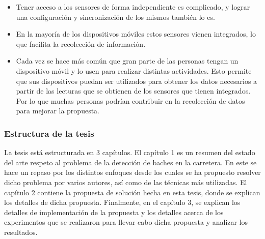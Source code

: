 		\begin{itemize}
			\item Tener acceso a los sensores de forma independiente es complicado, y lograr una configuración y sincronización de los mismos también lo es.
			\item En la mayoría de los dispositivos móviles estos sensores vienen integrados, lo que facilita la recolección de información.
			\item Cada vez se hace más común que gran parte de las personas tengan un dispositivo móvil y lo usen para realizar distintas actividades.
				Esto permite que sus dispositivos puedan ser utilizados para obtener los datos necesarios a partir de las lecturas que se obtienen de los
				sensores que tienen integrados. Por lo que muchas personas podrían contribuir en la recolección de datos para mejorar la propuesta.
		\end{itemize}

	\subsubsection*{Estructura de la tesis}
		La tesis está estructurada en 3 capítulos. El capítulo 1 es un resumen del estado del arte respeto al problema de la detección de baches en
		la carretera. En este se hace un repaso por los distintos enfoques desde los cuales se ha propuesto resolver dicho problema por varios autores,
		así como de las técnicas más utilizadas. El capítulo 2 contiene la propuesta de solución hecha en esta tesis, donde se explican los detalles de 
		dicha propuesta. Finalmente, en el capítulo 3, se explican los detalles de implementación de la propuesta y los detalles acerca de los experimentos
		que se realizaron para llevar cabo dicha propuesta y analizar los resultados.
